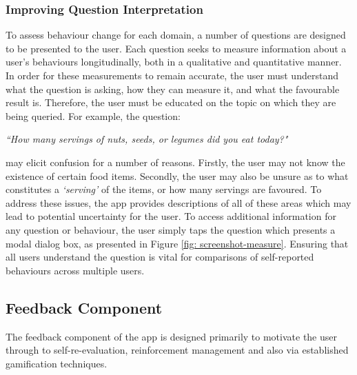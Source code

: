 \subsubsection{Improving Question Interpretation}
To assess behaviour change for each domain, a number of questions are designed to be presented to the user. Each question seeks to measure information about a user's behaviours longitudinally, both in a qualitative and quantitative manner. In order for these measurements to remain accurate, the user must understand what the question is asking, how they can measure it, and what the favourable result is. Therefore, the user must be educated on the topic on which they are being queried.
For example, the question:
\begin{displayquote}
\textit{``How many servings of nuts, seeds, or legumes did you eat today?"}
\end{displayquote}
may elicit confusion for a number of reasons. Firstly, the user may not know the existence of certain food items. Secondly, the user may also be unsure as to what constitutes a \textit{`serving'} of the items, or how many servings are favoured.
To address these issues, the app provides descriptions of all of these areas which may lead to potential uncertainty for the user. To access additional information for any question or behaviour, the user simply taps the question which presents a modal dialog box, as presented in Figure \ref{fig: screenshot-measure}. Ensuring that all users understand the question is vital for comparisons of self-reported behaviours across multiple users.

\subsection{Feedback Component}
The feedback component of the app is designed primarily to motivate the user through to self-re-evaluation, reinforcement management and also via established gamification techniques.

